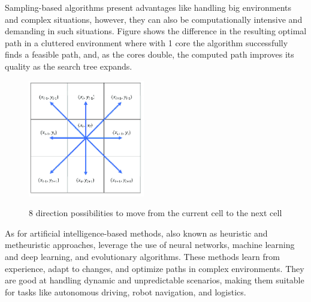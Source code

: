Sampling-based algorithms present advantages like handling big environments and complex situations, 
however, they can also be computationally intensive and demanding in such situations. 
Figure  shows the difference in the resulting optimal path in a cluttered environment where with 
1 core the algorithm successfully finds a feasible path, and, as the cores double, the computed path 
improves its quality as the search tree expands. 


\begin{figure}[H]
    \begin{center}
       \includegraphics[width=2in]{images/Chap1/8dirs_pathPlan.png}\\
       \caption{8 direction possibilities to move from the current cell to the next cell \cite{R14}}
       \label{direction possibilities}
       \end{center}
\end{figure}

As for artificial intelligence-based methods, also known as heuristic and metheuristic approaches, 
leverage the use of neural networks, machine learning and deep learning, and evolutionary algorithms. 
These methods learn from experience, adapt to changes, and optimize paths in complex environments. 
They are good at handling dynamic and unpredictable scenarios, making them suitable for tasks like 
autonomous driving, robot navigation, and logistics. 



